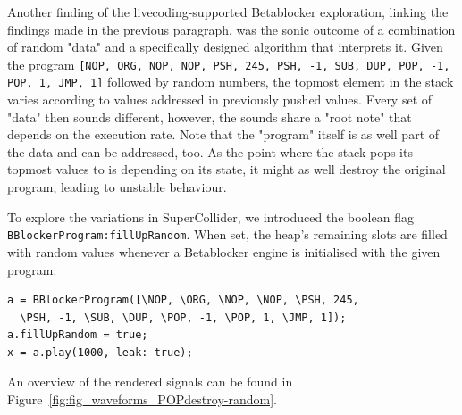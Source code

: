 \documentclass[letterpaper, 12pt]{article}
\begin{document}
Another finding of the livecoding-supported Betablocker exploration, linking the findings made in the previous paragraph,
was the sonic outcome of a combination of random "data" and a specifically designed algorithm that interprets it.
Given the program
\texttt{[NOP, ORG, NOP, NOP, PSH, 245, PSH, -1, SUB, DUP, POP, -1, POP, 1, JMP, 1]} 
followed by random numbers, the topmost element in the stack varies according to values addressed in previously pushed values.
Every set of "data" then sounds different, however, the sounds share a "root note" that depends on the execution rate.
Note that the "program" itself is as well part of the data and can be addressed, too.
As the point where the stack pops its topmost values to is depending on its state, it might as well destroy the original program, leading to unstable behaviour.

To explore the variations in SuperCollider, we introduced the boolean flag \texttt{BBlockerProgram:fillUpRandom}.
When set, the heap's remaining slots are filled with random values whenever a Betablocker engine is initialised with the given program:

\begin{Verbatim}[fontfamily=courier, xleftmargin=\parindent]
a = BBlockerProgram([\NOP, \ORG, \NOP, \NOP, \PSH, 245, 
  \PSH, -1, \SUB, \DUP, \POP, -1, \POP, 1, \JMP, 1]);
a.fillUpRandom = true;
x = a.play(1000, leak: true);
\end{Verbatim}



An overview of the rendered signals can be found in Figure~\ref{fig:fig_waveforms_POPdestroy-random}.
\end{document}
